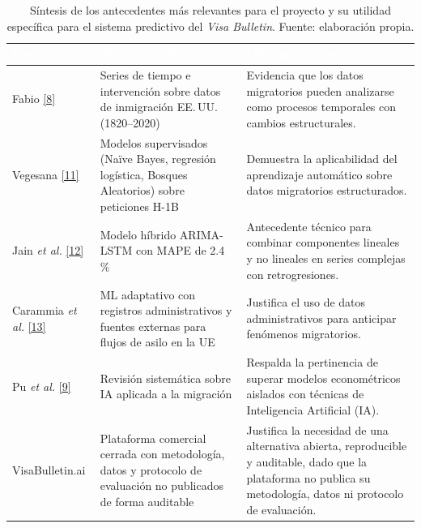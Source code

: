 \documentclass[12pt,letterpaper]{report}
\newcommand{\cita}[1]{\hyperref[bib:#1]{[#1]}}
\begin{document}
\begin{table}[H]
    \centering
    \footnotesize
    \setlength{\arrayrulewidth}{0.7pt}
    \setlength{\tabcolsep}{4pt}
    \begin{tabular}{>{\raggedright\arraybackslash}p{3.0cm}
                    >{\raggedright\arraybackslash}p{4.2cm}
                    >{\raggedright\arraybackslash}p{5.6cm}}
        \hline
        \rowcolor{uacjblue!85}
        \textcolor{white}{\textbf{Fuente}} &
        \textcolor{white}{\textbf{Técnica o enfoque}} &
        \textcolor{white}{\textbf{Utilidad para el proyecto}} \\
        \hline
        \rowcolor{uacjblue!4}
        Fabio \cita{8} & Series de tiempo e intervención sobre datos de inmigración EE.\,UU. (1820--2020) & Evidencia que los datos migratorios pueden analizarse como procesos temporales con cambios estructurales. \\
        Vegesana \cita{11} & Modelos supervisados (Naïve Bayes, regresión logística, Bosques Aleatorios) sobre peticiones H-1B & Demuestra la aplicabilidad del aprendizaje automático sobre datos migratorios estructurados. \\
        \rowcolor{uacjblue!4}
        Jain \textit{et al.} \cita{12} & Modelo híbrido ARIMA-LSTM con MAPE de 2.4\,\% & Antecedente técnico para combinar componentes lineales y no lineales en series complejas con retrogresiones. \\
        Carammia \textit{et al.} \cita{13} & ML adaptativo con registros administrativos y fuentes externas para flujos de asilo en la UE & Justifica el uso de datos administrativos para anticipar fenómenos migratorios. \\
        \rowcolor{uacjblue!4}
        Pu \textit{et al.} \cita{9} & Revisión sistemática sobre IA aplicada a la migración & Respalda la pertinencia de superar modelos econométricos aislados con técnicas de Inteligencia Artificial (IA). \\
        VisaBulletin.ai & Plataforma comercial cerrada con metodología, datos y protocolo de evaluación no publicados de forma auditable & Justifica la necesidad de una alternativa abierta, reproducible y auditable, dado que la plataforma no publica su metodología, datos ni protocolo de evaluación. \\
        \hline
    \end{tabular}
    \caption[Síntesis de antecedentes relevantes para el proyecto.]{Síntesis de los antecedentes más relevantes para el proyecto y su utilidad específica para el sistema predictivo del \textit{Visa Bulletin}. Fuente: elaboración propia.}
    \label{tab:antecedentes}
\end{table}
\end{document}
